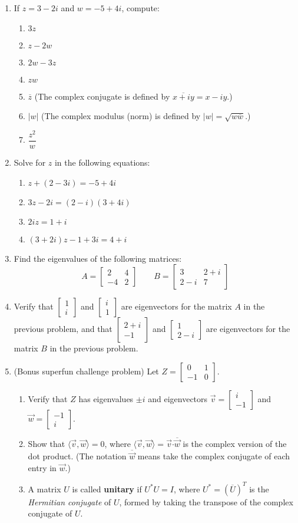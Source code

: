 \documentclass[12pt]{article}
\newcommand{\abs}[1]{\lvert #1\rvert}
\renewcommand{\i}{\mathbf{i}}
\newcommand{\dotp}{\boldsymbol{\cdot}}
\newcommand{\bbm}{\begin{bmatrix}}
\newcommand{\ebm}{\end{bmatrix}}
\begin{document}
\thispagestyle{fancy}

 \begin{enumerate}
  \item If $z=3-2i$ and $w = -5+4i$, compute:
  \begin{enumerate}
  \item $3z$
  \item $z-2w$
  \item $2w-3z$
  \item $zw$
  \item $\overline{z}$ (The complex conjugate is defined by $\overline{x+iy}=x-iy$.)
  \item $\abs{w}$ (The complex modulus (norm) is defined by $\abs{w} = \sqrt{w\overline{w}}$.)
  \item $\dfrac{z^2}{w}$
  \end{enumerate}
 
  
 \item Solve for $z$ in the following equations:
\begin{enumerate}
\item $z+(2-3i)=-5+4i$
\item $3z-2i = (2-i)(3+4i)$
\item $2iz = 1+i$
\item $(3+2i)z -1+3i = 4+i$
\end{enumerate} 
\item Find the eigenvalues of the following matrices:
\[
A = \bbm 2&4\\-4&2\ebm \quad\quad B = \bbm 3&2+i\\2-i&7\ebm
\]
\item Verify that $\bbm 1\\i\ebm$ and $\bbm i\\1\ebm$ are eigenvectors for the matrix $A$ in the previous problem, and that $\bbm 2+i\\-1\ebm$ and $\bbm 1\\2-i\ebm$ are eigenvectors for the matrix $B$ in the previous problem.
\item (Bonus superfun challenge problem) Let $Z=\bbm 0&1\\-1&0\ebm$.
\begin{enumerate}
\item Verify that $Z$ has eigenvalues $\pm i$ and eigenvectors $\vec{v}=\bbm i\\-1\ebm$ and $\vec{w}=\bbm -1\\i\ebm$.
\item Show that $\langle \vec{v},\vec{w}\rangle = 0$, where $\langle \vec{v},\vec{w}\rangle = \vec{v}\dotp \overline{\vec{w}}$ is the complex version of the dot product. (The notation $\overline{\vec{w}}$ means take the complex conjugate of each entry in $\vec{w}$.) 
\item A matrix $U$ is called \textbf{unitary} if $U^*U=I$, where $U^*=(\overline{U})^T$ is the \textit{Hermitian conjugate} of $U$, formed by taking the transpose of the complex conjugate of $U$.


\end{enumerate}
\end{enumerate}
\end{document}
